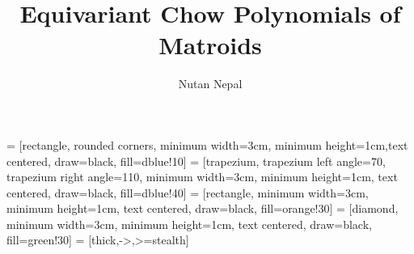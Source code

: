 \documentclass[final]{beamer}
\title{Equivariant Chow Polynomials of Matroids} %
\author{Nutan Nepal} %
\institute{Department of Mathematics, North Carolina State University} %
\begin{document}
 = [rectangle, rounded corners, minimum width=3cm, minimum height=1cm,text centered, draw=black, fill=dblue!10]
 = [trapezium, trapezium left angle=70, trapezium right angle=110, minimum width=3cm, minimum height=1cm, text centered, draw=black, fill=dblue!40]
 = [rectangle, minimum width=3cm, minimum height=1cm, text centered, draw=black, fill=orange!30]
 = [diamond, minimum width=3cm, minimum height=1cm, text centered, draw=black, fill=green!30]
 = [thick,->,>=stealth]




\setlength{\belowcaptionskip}{2ex} %
\setlength\belowdisplayshortskip{2ex} %
\end{document}

